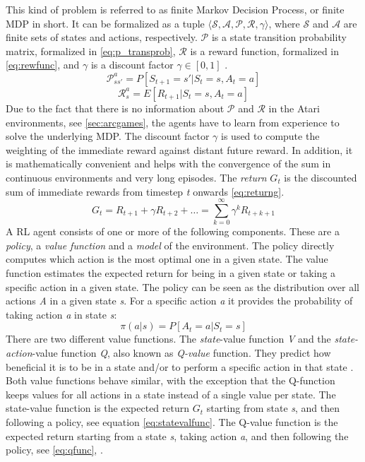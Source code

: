 This kind of problem is referred to as finite Markov Decision Process, or finite MDP in short. It can be formalized as a tuple \(\langle \mathcal{S, A, P, R, } \gamma \rangle\), where \(\mathcal{S}\) and \(\mathcal{A}\) are finite sets of states and actions, respectively. \(\mathcal{P}\) is a state transition probability matrix, formalized in \ref{eq:p_transprob}, \(\mathcal{R}\) is a reward function, formalized in \ref{eq:rewfunc}, and \(\gamma\) is a discount factor \(\gamma \in [0,1]\) \cite{silver2020MDP}.
\begin{equation}
\mathcal{P}_{ss'}^{a} = P[S_{t+1} = s' | S_{t} = s, A_{t} = a]
\label{eq:p_transprob}
\end{equation}
\begin{equation}
\mathcal{R}_{s}^{a} = E[R_{t+1} | S_{t} = s, A_{t} = a] 
\label{eq:rewfunc}
\end{equation}
Due to the fact that there is no information about \(\mathcal{P}\) and \(\mathcal{R}\) in the Atari environments, see \ref{sec:arcgames}, the agents have to learn from experience to solve the underlying MDP. The discount factor \(\gamma\) is used to compute the weighting of the immediate reward against distant future reward. In addition, it is mathematically convenient and helps with the convergence of the sum in continuous environments and very long episodes. The \textit{return} \(G_{t}\) is the discounted sum of immediate rewards from timestep \textit{t} onwards \ref{eq:returng}.
\begin{equation}
G_{t} = R_{t+1} + \gamma R_{t+2} + \dots =   \displaystyle\sum_{k=0}^{\infty} \gamma ^{k}R_{t+k+1}
\label{eq:returng}
\end{equation}
A RL agent consists of one or more of the following components. These are a \textit{policy}, a \textit{value function} and a \textit{model} of the environment. The policy directly computes which action is the most optimal one in a given state. The value function estimates the expected return for being in a given state or taking a specific action in a given state. The policy can be seen as the distribution over all actions \textit{A} in a given state \textit{s}. For a specific action \textit{a} it provides the probability of taking action \textit{a} in state \textit{s}:
\begin{equation}
\pi(a|s) = P[A_{t} = a | S_{t} = s]
\label{eq:}
\end{equation}
There are two different value functions. The \textit{state}-value function \textit{V} and the \textit{state-action}-value function \textit{Q}, also known as \textit{Q-value} function. They predict how beneficial it is to be in a state and/or to perform a specific action in that state \cite{silver2020RL}. Both value functions behave similar, with the exception that the Q-function keeps values for all actions in a state instead of a single value per state. The state-value function is the expected return \(G_{t}\) starting from state \textit{s}, and then following a policy, see equation \ref{eq:statevalfunc}. The Q-value function is the expected return starting from a state \textit{s}, taking action \textit{a}, and then following the policy, see \ref{eq:qfunc}, \cite{silver2020MDP}.
